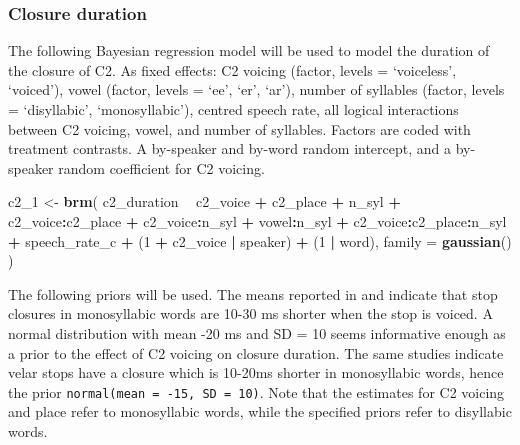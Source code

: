\documentclass[11pt,]{article}
\newenvironment{Shaded}{\begin{snugshade}}{\end{snugshade}}
\newcommand{\DataTypeTok}[1]{\textcolor[rgb]{0.13,0.29,0.53}{#1}}
\newcommand{\DecValTok}[1]{\textcolor[rgb]{0.00,0.00,0.81}{#1}}
\newcommand{\KeywordTok}[1]{\textcolor[rgb]{0.13,0.29,0.53}{\textbf{#1}}}
\newcommand{\NormalTok}[1]{#1}
\newcommand{\OperatorTok}[1]{\textcolor[rgb]{0.81,0.36,0.00}{\textbf{#1}}}
\newcommand{\StringTok}[1]{\textcolor[rgb]{0.31,0.60,0.02}{#1}}
\begin{document}
\hypertarget{closure-duration}{%
\subsubsection{Closure duration}\label{closure-duration}}

\label{s:closure}

The following Bayesian regression model will be used to model the
duration of the closure of C2. As fixed effects: C2 voicing (factor,
levels = `voiceless', `voiced'), vowel (factor, levels = `ee', `er',
`ar'), number of syllables (factor, levels = `disyllabic',
`monosyllabic'), centred speech rate, all logical interactions between
C2 voicing, vowel, and number of syllables. Factors are coded with
treatment contrasts. A by-speaker and by-word random intercept, and a
by-speaker random coefficient for C2 voicing.

\begin{Shaded}
\begin{Highlighting}[]
\NormalTok{c2_}\DecValTok{1}\NormalTok{ <-}\StringTok{ }\KeywordTok{brm}\NormalTok{(}
\NormalTok{  c2_duration }\OperatorTok{~}
\StringTok{    }\NormalTok{c2_voice }\OperatorTok{+}
\StringTok{    }\NormalTok{c2_place }\OperatorTok{+}
\StringTok{    }\NormalTok{n_syl }\OperatorTok{+}
\StringTok{    }\NormalTok{c2_voice}\OperatorTok{:}\NormalTok{c2_place }\OperatorTok{+}
\StringTok{    }\NormalTok{c2_voice}\OperatorTok{:}\NormalTok{n_syl }\OperatorTok{+}
\StringTok{    }\NormalTok{vowel}\OperatorTok{:}\NormalTok{n_syl }\OperatorTok{+}
\StringTok{    }\NormalTok{c2_voice}\OperatorTok{:}\NormalTok{c2_place}\OperatorTok{:}\NormalTok{n_syl }\OperatorTok{+}
\StringTok{    }\NormalTok{speech_rate_c }\OperatorTok{+}
\StringTok{    }\NormalTok{(}\DecValTok{1} \OperatorTok{+}\StringTok{ }\NormalTok{c2_voice }\OperatorTok{|}\StringTok{ }\NormalTok{speaker) }\OperatorTok{+}
\StringTok{    }\NormalTok{(}\DecValTok{1} \OperatorTok{|}\StringTok{ }\NormalTok{word),}
  \DataTypeTok{family =} \KeywordTok{gaussian}\NormalTok{()}
\NormalTok{)}
\end{Highlighting}
\end{Shaded}

The following priors will be used. The means reported in
\citet{sharf1962} and \citet{luce1985} indicate that stop closures in
monosyllabic words are 10-30 ms shorter when the stop is voiced. A
normal distribution with mean -20 ms and SD = 10 seems informative
enough as a prior to the effect of C2 voicing on closure duration. The
same studies indicate velar stops have a closure which is 10-20ms
shorter in monosyllabic words, hence the prior
\texttt{normal(mean\ =\ -15,\ SD\ =\ 10)}. Note that the estimates for
C2 voicing and place refer to monosyllabic words, while the specified
priors refer to disyllabic words.
\end{document}
